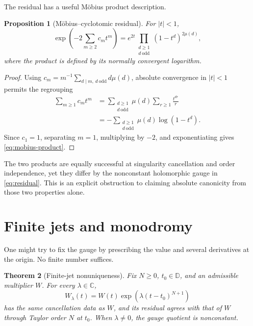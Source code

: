 \documentclass[11pt]{article}
\newtheorem{theorem}{Theorem}[section]
\newtheorem{proposition}[theorem]{Proposition}
\newcommand{\D}{\mathbb D}
\begin{document}
The residual has a useful M\"obius product description.

\begin{proposition}[M\"obius--cyclotomic residual]\label{prop:mobius-product}
For \(|t|<1\),
\begin{equation}\label{eq:mobius-product}
 \exp\!\left(-2\sum_{m\ge2}c_mt^m\right)
 =e^{2t}\prod_{\substack{d\ge1\\d\ \text{odd}}}
 (1-t^d)^{2\mu(d)},
\end{equation}
where the product is defined by its normally convergent logarithm.
\end{proposition}

\begin{proof}
Using
\(c_m=m^{-1}\sum_{d\mid m,\ d\ \text{odd}}d\mu(d)\), absolute convergence
in \(|t|<1\) permits the regrouping
\begin{align*}
 \sum_{m\ge1}c_mt^m
 &=\sum_{\substack{d\ge1\\d\ \text{odd}}}\mu(d)
   \sum_{r\ge1}\frac{t^{dr}}r\\
 &=-\sum_{\substack{d\ge1\\d\ \text{odd}}}\mu(d)\log(1-t^d).
\end{align*}
Since \(c_1=1\), separating \(m=1\), multiplying by \(-2\), and
exponentiating gives \cref{eq:mobius-product}.
\end{proof}

The two products are equally successful at singularity cancellation and
order independence, yet they differ by the nonconstant holomorphic gauge in
\cref{eq:residual}.  This is an explicit obstruction to claiming absolute
canonicity from those two properties alone.

\section{Finite jets and monodromy}

One might try to fix the gauge by prescribing the value and several
derivatives at the origin.  No finite number suffices.

\begin{theorem}[Finite-jet nonuniqueness]\label{thm:finite-jet}
Fix \(N\ge0\), \(t_0\in\D\), and an admissible multiplier \(W\).  For every
\(\lambda\in\mathbb C\),
\begin{equation}\label{eq:jet-gauge}
 W_\lambda(t)=W(t)\exp\!\left(\lambda(t-t_0)^{N+1}\right)
\end{equation}
has the same cancellation data as \(W\), and its residual agrees with that
of \(W\) through Taylor order \(N\) at \(t_0\).  When \(\lambda\ne0\), the
gauge quotient is nonconstant.
\end{theorem}
\end{document}
